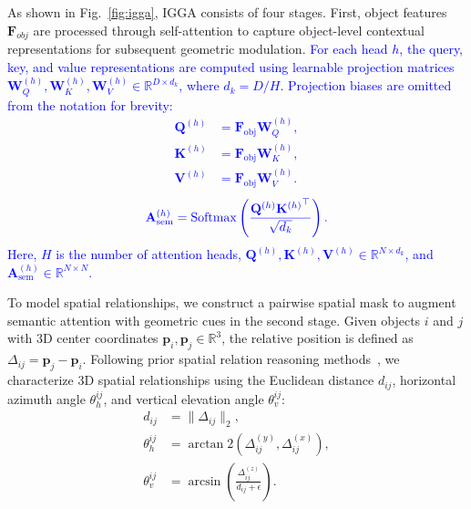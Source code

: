 \documentclass[lettersize,journal]{IEEEtran}
\begin{document}
As shown in Fig.~\ref{fig:igga}, IGGA consists of four stages. First, object features $\mathbf{F}_{obj}$ are processed through self-attention to capture object-level contextual representations for subsequent geometric modulation. \textcolor{blue}{For each head $h$, the query, key, and value representations are computed using learnable projection matrices $\mathbf{W}_{Q}^{(h)}, \mathbf{W}_{K}^{(h)}, \mathbf{W}_{V}^{(h)} \in \mathbb{R}^{D \times d_k}$, where $d_k=D/H$. Projection biases are omitted from the notation for brevity:}
\textcolor{blue}{
\begin{align}
    \mathbf{Q}^{(h)} &= \mathbf{F}_{\mathrm{obj}}\mathbf{W}_{Q}^{(h)},\\
    \mathbf{K}^{(h)} &= \mathbf{F}_{\mathrm{obj}}\mathbf{W}_{K}^{(h)},\\
    \mathbf{V}^{(h)} &= \mathbf{F}_{\mathrm{obj}}\mathbf{W}_{V}^{(h)}.
\end{align}
}
\begin{equation}
\textcolor{blue}{
    \mathbf{A}_{\mathrm{sem}}^{(h)}
    =
    \operatorname{Softmax}
    \left(
    \frac{\mathbf{Q}^{(h)}{\mathbf{K}^{(h)}}^{\top}}
    {\sqrt{d_k}}
    \right).
}
\end{equation}
\textcolor{blue}{Here, $H$ is the number of attention heads, $\mathbf{Q}^{(h)}, \mathbf{K}^{(h)}, \mathbf{V}^{(h)} \in \mathbb{R}^{N \times d_k}$, and $\mathbf{A}_{\mathrm{sem}}^{(h)} \in \mathbb{R}^{N \times N}$.}

To model spatial relationships, we construct a pairwise spatial mask to augment semantic attention with geometric cues in the second stage. Given objects $i$ and $j$ with 3D center coordinates $\mathbf{p}_i, \mathbf{p}_j \in \mathbb{R}^3$, the relative position is defined as $\Delta_{ij} = \mathbf{p}_j - \mathbf{p}_i$. Following prior spatial relation reasoning methods~\cite{ViL3DRel2022}, we characterize 3D spatial relationships using the Euclidean distance $d_{ij}$, horizontal azimuth angle $\theta_h^{ij}$, and vertical elevation angle $\theta_v^{ij}$:
\begin{align}
d_{ij} &= \|\Delta_{ij}\|_2, \\
\theta_h^{ij} &= \arctan2(\Delta_{ij}^{(y)}, \Delta_{ij}^{(x)}), \\
\theta_v^{ij} &= \arcsin\left(\frac{\Delta_{ij}^{(z)}}{d_{ij} + \epsilon}\right).
\end{align}
\end{document}
